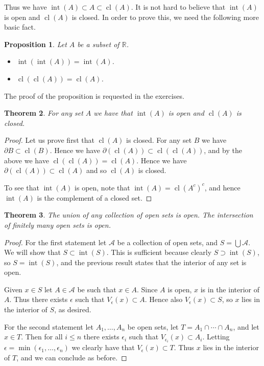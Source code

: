\documentclass[11pt,oneside]{amsbook}
\newcommand{\RR}{\mathbb R}
\DeclareMathOperator{\cl}{cl}
\DeclareMathOperator{\inte}{int}
\theoremstyle{definition}
\theoremstyle{plain}
\newtheorem{thm}{Theorem}[section]
\newtheorem{prop}[thm]{Proposition}
\theoremstyle{definition}
\theoremstyle{remark}
\numberwithin{equation}{section}
\numberwithin{figure}{section}
\begin{document}
Thus we have $\inte(A)\subset A\subset\cl(A)$. It is not hard to believe that $\inte(A)$ is open and $\cl(A)$ is closed. In order to prove this, we need the following more basic fact.

\begin{prop}
  \label{prop:closure}
  Let $A$ be a subset of $\RR$.
  \begin{itemize}
    \item $\inte(\inte(A))=\inte(A)$.
    \item $\cl(\cl(A))=\cl(A)$.
  \end{itemize}
\end{prop}

The proof of the proposition is requested in the exercises.

\begin{thm}
  For any set $A$ we have that $\inte(A)$ is open and $\cl(A)$ is closed.
\end{thm}

\begin{proof}
  Let us prove first that $\cl(A)$ is closed. For any set $B$ we have $\partial B\subset \cl(B)$. Hence we have $\partial(\cl(A))\subset\cl(\cl(A))$, and by the above we have $\cl(\cl(A))=\cl(A)$. Hence we have $\partial(\cl(A))\subset\cl(A)$ and so $\cl(A)$ is closed.
  
  To see that $\inte(A)$ is open, note that $\inte(A)=\cl(A^c)^c$, and hence $\inte(A)$ is the complement of a closed set.
\end{proof}

\begin{thm}
  The union of any collection of open sets is open. The intersection of finitely many open sets is open.
\end{thm}

\begin{proof}
  For the first statement let $\mathcal A$ be a collection of open sets, and $S=\bigcup\mathcal A$. We will show that $S\subset\inte(S)$. This is sufficient because clearly $S\supset\inte(S)$, so $S=\inte(S)$, and the previous result states that the interior of any set is open.
  
  Given $x\in S$ let $A\in\mathcal A$ be such that $x\in A$. Since $A$ is open, $x$ is in the interior of $A$. Thus there exists $\epsilon$ such that $V_\epsilon(x)\subset A$. Hence also $V_\epsilon(x)\subset S$, so $x$ lies in the interior of $S$, as desired.

  For the second statement let $A_1,\ldots,A_n$ be open sets, let $T=A_1\cap\cdots\cap A_n$, and let $x\in T$. Then for all $i\leq n$ there exists $\epsilon_i$ such that $V_{\epsilon_i}(x)\subset A_i$. Letting $\epsilon=\min(\epsilon_1,\ldots,\epsilon_n)$ we clearly have that $V_\epsilon(x)\subset T$. Thus $x$ lies in the interior of $T$, and we can conclude as before.
\end{proof}
\end{document}
